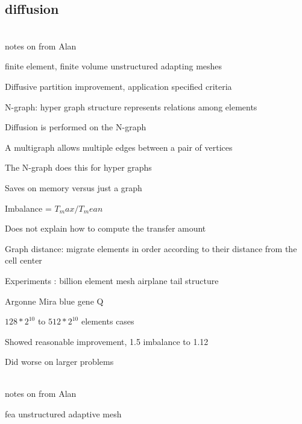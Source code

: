 \documentclass{article}
\begin{document}
\subsection{diffusion}

\let\clearpage\relax

\cite{Diamond:2017:DLB:3148226.3148236}\\

notes on \cite{Diamond:2017:DLB:3148226.3148236}
from Alan

finite element, finite volume unstructured adapting meshes

Diffusive partition improvement, application specified criteria

N-graph: hyper graph structure represents relations among elements

Diffusion is performed on the N-graph

A multigraph allows multiple edges between a pair of vertices

The N-graph does this for hyper graphs

Saves on memory versus just a graph

Imbalance = $T_max / T_mean$

Does not explain how to compute the transfer amount

Graph distance: migrate elements in order according to their distance from the cell center

Experiments : billion element mesh airplane tail structure

Argonne Mira blue gene Q

$128*2^{10}$ to $512*2^{10}$ elements cases

Showed reasonable improvement, 1.5 imbalance to 1.12

Did worse on larger problems



\cite{HORTON1993209}\\



notes on \cite{HORTON1993209}
from Alan

fea unstructured adaptive mesh
\end{document}
